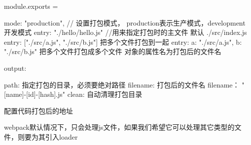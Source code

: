                             module.exports = {

                            mode: "production",     // 设置打包模式， production表示生产模式，development 开发模式
                             entry: "./hello/hello.js"   //用来指定打包时的主文件  默认  ./src/index.js
                             entry: ["./src/a.js", "./src/b.js"]      把多个文件打包到一起
                             entry: {    
                                 a: "./src/a.js", 
                                 b: "./src/b.js"          把多个文件打包成多个文件 对象的属性名为打包后的文件名
                              }

                             output: {   
                                 path:      指定打包的目录，必须要绝对路径
                                 filename:  打包后的文件名
                                  filename： "[name]-[id]-[hash].js"
                                  clean:      自动清理打包目录

                             }    配置代码打包后的地址

                            
                              webpack默认情况下，只会处理js文件，如果我们希望它可以处理其它类型的文件，则要为其引入loader
                             
}
